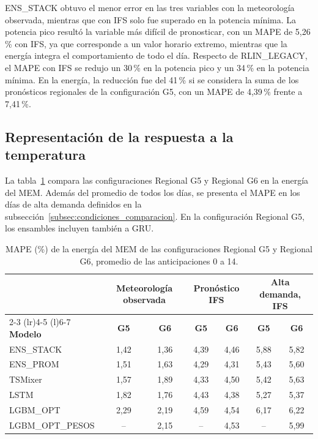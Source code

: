 ENS\_STACK obtuvo el menor error en las tres variables con la meteorología observada, mientras que con IFS solo fue superado en la potencia mínima. La potencia pico resultó la variable más difícil de pronosticar, con un MAPE de 5,26\,\% con IFS, ya que corresponde a un valor horario extremo, mientras que la energía integra el comportamiento de todo el día. Respecto de RLIN\_LEGACY, el MAPE con IFS se redujo un 30\,\% en la potencia pico y un 34\,\% en la potencia mínima. En la energía, la reducción fue del 41\,\% si se considera la suma de los pronósticos regionales de la configuración G5, con un MAPE de 4,39\,\% frente a 7,41\,\%.

\subsection{Representación de la respuesta a la temperatura}
\label{subsec:resultados_temperatura}

La tabla~\ref{tab:resultados_g6} compara las configuraciones Regional G5 y Regional G6 en la energía del MEM. Además del promedio de todos los días, se presenta el MAPE en los días de alta demanda definidos en la subsección~\ref{subsec:condiciones_comparacion}. En la configuración Regional G5, los ensambles incluyen también a GRU.

\begin{table}[H]
	\centering
	\caption{MAPE (\%) de la energía del MEM de las configuraciones Regional G5 y Regional G6, promedio de las anticipaciones 0 a 14.}
	\label{tab:resultados_g6}
	\small
	\setlength{\tabcolsep}{4pt}
	\renewcommand{\arraystretch}{1.15}
	\begin{tabular*}{\textwidth}{@{\extracolsep{\fill}}lcccccc@{}}
		\toprule
		& \multicolumn{2}{c}{\textbf{Meteorología observada}} & \multicolumn{2}{c}{\textbf{Pronóstico IFS}} & \multicolumn{2}{c}{\textbf{Alta demanda, IFS}} \\
		\cmidrule(lr){2-3} \cmidrule(lr){4-5} \cmidrule(l){6-7}
		\textbf{Modelo} & \textbf{G5} & \textbf{G6} & \textbf{G5} & \textbf{G6} & \textbf{G5} & \textbf{G6} \\
		\midrule
		ENS\_STACK & 1,42 & 1,36 & 4,39 & 4,46 & 5,88 & 5,82 \\
		ENS\_PROM & 1,51 & 1,63 & 4,29 & 4,31 & 5,43 & 5,60 \\
		TSMixer & 1,57 & 1,89 & 4,33 & 4,50 & 5,42 & 5,63 \\
		LSTM & 1,82 & 1,76 & 4,43 & 4,38 & 5,27 & 5,37 \\
		LGBM\_OPT & 2,29 & 2,19 & 4,59 & 4,54 & 6,17 & 6,22 \\
		LGBM\_OPT\_PESOS & -- & 2,15 & -- & 4,53 & -- & 5,99 \\
		\bottomrule
	\end{tabular*}
\end{table}

